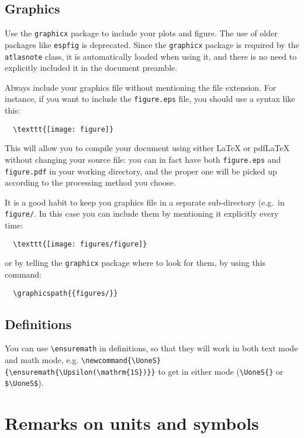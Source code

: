 \documentclass[koma,UKenglish]{style/atlasdoc}
\begin{document}
\subsection{Graphics}

Use the {\tt graphicx} package \cite{} to include your plots and
figure. The use of older packages like {\tt espfig} is deprecated.
Since the {\tt graphicx} package is required by the {\tt atlasnote}
class, it is automatically loaded when using it, and there is no need
to explicitly included it in the document preamble.

Always include your graphics file without mentioning the file
extension. For instance, if you want to include the \texttt{figure.eps}
file, you should use a syntax like this:
\begin{verbatim}
  \texttt{[image: figure]}
\end{verbatim}
This will allow you to compile your document using either \LaTeX{} or
pdf\LaTeX{} without changing your source file: you can in fact have
both \texttt{figure.eps} and \texttt{figure.pdf} in your working directory,
and the proper one will be picked up according to the processing method
you choose.

It is a good habit to keep you graphics file in a separate
sub-directory (e.g.\ in \texttt{figure/}. In this case you can include them
by mentioning it explicitly every time:
\begin{verbatim}
  \texttt{[image: figures/figure]}
\end{verbatim}
or by telling the \texttt{graphicx} package where to look
for them, by using this command:
\begin{verbatim}
  \graphicspath{{figures/}}
\end{verbatim}


\subsection{Definitions}

You can use \verb|\ensuremath| in definitions, so that they will work
in both text mode and math mode, e.g.
\verb|\newcommand{\UoneS}{\ensuremath{\Upsilon(\mathrm{1S})}}| to get
\UoneS{} in either mode (\verb|\UoneS{}| or \verb|$\UoneS$|).


\section{Remarks on units and symbols}
\end{document}
